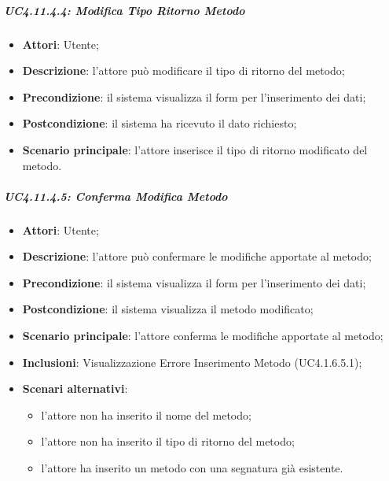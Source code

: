 \subparagraph{UC4.11.4.4: Modifica Tipo Ritorno Metodo}
\label{UC4.11.4.4}
\begin{itemize}
\item \textbf{Attori}: Utente;
\item \textbf{Descrizione}: l'attore può modificare il tipo di ritorno del metodo;	
\item \textbf{Precondizione}: il sistema visualizza il form per l'inserimento dei dati;	
\item \textbf{Postcondizione}: il sistema ha ricevuto il dato richiesto;	
\item \textbf{Scenario principale}:
l'attore inserisce il tipo di ritorno modificato del metodo.	
\end{itemize}

\subparagraph{UC4.11.4.5: Conferma Modifica Metodo}
\label{UC4.11.4.5}
\begin{itemize}
\item \textbf{Attori}: Utente;
\item \textbf{Descrizione}: l'attore può confermare le modifiche apportate al metodo;	
\item \textbf{Precondizione}: il sistema visualizza il form per l'inserimento dei dati;	
\item \textbf{Postcondizione}: il sistema visualizza il metodo modificato;	
\item \textbf{Scenario principale}:
l'attore conferma le modifiche apportate al metodo;	
\item \textbf{Inclusioni}:
Visualizzazione Errore Inserimento Metodo (UC4.1.6.5.1);
\item \textbf{Scenari alternativi}:
\begin{itemize}
\item l'attore non ha inserito il nome del metodo;
\item l'attore non ha inserito il tipo di ritorno del metodo;
\item l'attore ha inserito un metodo con una segnatura già esistente.
\end{itemize}
\end{itemize}


